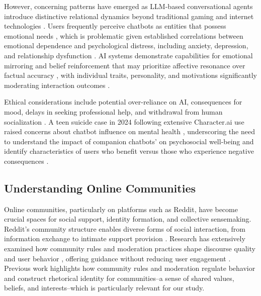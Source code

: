 \documentclass[sigconf, nonacm]{acmart}
\begin{document}
However, concerning patterns have emerged as LLM-based conversational agents introduce distinctive relational dynamics beyond traditional gaming and internet technologies \cite{yu2024development}. Users frequently perceive chatbots as entities that possess emotional needs \cite{laestadius2024too, pentina2023exploring}, which is problematic given established correlations between emotional dependence and psychological distress, including anxiety, depression, and relationship dysfunction \cite{macia2023emotional, castillo2024dating, tomaz2022psychological}. AI systems demonstrate capabilities for emotional mirroring and belief reinforcement that may prioritize affective resonance over factual accuracy \cite{pataranutaporn2023influencing, sharma2023towards, perez2022discovering, pataranutaporn2024cyborg}, with individual traits, personality, and motivations significantly moderating interaction outcomes \cite{hickin2021effectiveness, cacioppo2018growing, liu2024chatbot, pataranutaporn2023influencing, chen2024designing, xia2024impact, pataranutaporn2024cyborg, fang2025ai}. 

Ethical considerations include potential over-reliance on AI, consequences for mood, delays in seeking professional help, and withdrawal from human socialization \cite{mahari2025addictive, mahari2024we}. A teen suicide case in 2024 following extensive Character.ai use raised concerns about chatbot influence on mental health \cite{Roose2024-nw}, underscoring the need to understand the impact of companion chatbots' on psychosocial well-being and identify characteristics of users who benefit versus those who experience negative consequences \cite{Calvo2017-br}.

\subsection{Understanding Online Communities}
Online communities, particularly on platforms such as Reddit, have become crucial spaces for social support, identity formation, and collective sensemaking. Reddit's community structure enables diverse forms of social interaction, from information exchange to intimate support provision \cite{gauthier2022will, vakeva2025don}. Research has extensively examined how community rules and moderation practices shape discourse quality and user behavior \cite{lloyd2025ai, lambert2025does}, offering guidance without reducing user engagement \cite{fang2025shaping}. Previous work highlights how community rules and moderation regulate behavior and construct rhetorical identity for communities--a sense of shared values, beliefs, and interests--which is particularly relevant for our study.
\end{document}
